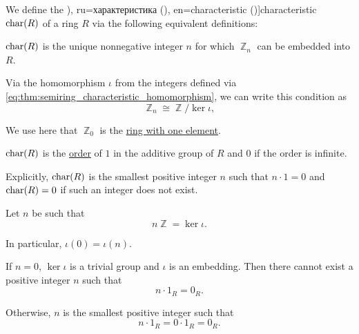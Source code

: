 \begin{definition}\label{def:ring_characteristic}\mimprovised
  We define the \term[bg=характеристика (\cite[133]{ГеновМиховскиМоллов1991}), ru=характеристика (\cite[32]{Винберг2014}), en=characteristic (\cite[148]{Knapp2016BasicAlgebra})]{characteristic} \( \op{char}(R) \) of a ring \( R \) via the following equivalent definitions:
  \begin{thmenum}
     \( \op{char}(R) \) is the unique nonnegative integer \( n \) for which \( \BbbZ_n \) can be embedded into \( R \).

    Via the homomorphism \( \iota \) from the integers defined via \eqref{eq:thm:semiring_characteristic_homomorphism}, we can write this condition as
    \begin{equation}\label{eq:def:ring_characteristic/embedding}
      \BbbZ_n \cong \BbbZ / \ker \iota,
    \end{equation}

    We use here that \( \BbbZ_0 \) is the \hyperref[def:ring/trivial]{ring with one element}.

     \( \op{char}(R) \) is the \hyperref[def:group_order]{order} of \( 1 \) in the additive group of \( R \) and \( 0 \) if the order is infinite.

    Explicitly, \( \op{char}(R) \) is the smallest positive integer \( n \) such that \( n \cdot 1 = 0 \) and \( \op{char}(R) = 0 \) if such an integer does not exist.
  \end{thmenum}
\end{definition}
\begin{defproof}
   Let \( n \) be such that
  \begin{equation*}
    n \BbbZ = \ker\iota.
  \end{equation*}

  In particular, \( \iota(0) = \iota(n) \).

  If \( n = 0 \), \( \ker\iota \) is a trivial group and \( \iota \) is an embedding. Then there cannot exist a positive integer \( n \) such that
  \begin{equation*}
    n \cdot 1_R = 0_R.
  \end{equation*}

  Otherwise, \( n \) is the smallest positive integer such that
  \begin{equation*}
    n \cdot 1_R = 0 \cdot 1_R = 0_R.
  \end{equation*}
\end{defproof}

